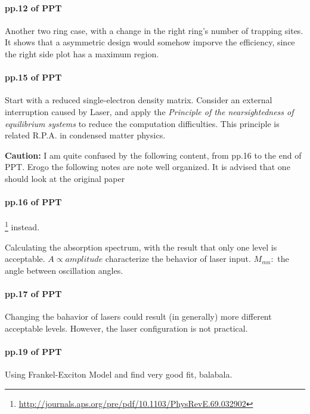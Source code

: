 \documentclass{article}
\numberwithin{equation}{subsection} %
\theoremstyle{definition}
\begin{document}
\paragraph{pp.12 of PPT}
Another two ring case, with a change in the right ring's number
of trapping sites. It shows that a asymmetric design would somehow
imporve the efficiency, since the right side plot has a maximum region.

\paragraph{pp.15 of PPT}

Start with a reduced single-electron density matrix. Consider an
external interruption caused by Laser, and apply the 
\textit{Principle of the nearsightedness of equilibrium systems} to
reduce the computation difficulties. This principle is related 
R.P.A. in condensed matter physics.

\textbf{Caution:} I am quite confused by the following content,
from pp.16 to the end of PPT. Erogo the
following notes are note well organized. It is advised that one should
look at the original paper
\paragraph{pp.16 of PPT}
\footnote{
\url{http://journals.aps.org/pre/pdf/10.1103/PhysRevE.69.032902}} 
instead.

Calculating the absorption spectrum, with the result that only one level
is acceptable.
$A\propto amplitude$ characterize the behavior of laser input. 
$M_{mn}:$ the angle between oscillation angles.

\paragraph{pp.17 of PPT}
Changing the bahavior of lasers could result (in generally) more
different acceptable levels. However, the laser configuration
is not practical.

\paragraph{pp.19 of PPT}
Using Frankel-Exciton Model and find very good fit, balabala.
\end{document}
